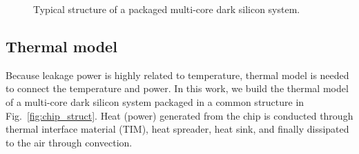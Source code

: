 \begin{figure}
  \centering
\caption{Typical structure of a
    packaged multi-core dark silicon system.}
\end{figure}

\subsection{Thermal model}\label{sec:therm_model}
Because leakage power is highly related to temperature, thermal
model is needed to connect the temperature and power.
In this work, we build the thermal model of a multi-core dark silicon system packaged in a common structure in Fig.~\ref{fig:chip_struct}. 
Heat (power) generated from the chip is conducted through thermal interface material (TIM), heat spreader, heat sink, and finally dissipated to the air through convection.

